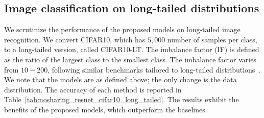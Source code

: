 \documentclass[runningheads]{llncs}
\providecommand{\citep}{\cite}
\begin{document}
         





















































\subsection{Image classification on long-tailed distributions}
\label{ssec:nosharing_experiments_long_tailed_distribution}

We scrutinize the performance of the proposed models on long-tailed image recognition. We convert CIFAR10, which has $5,000$ number of samples per class, to a long-tailed version, called CIFAR10-LT. The imbalance factor (IF) is defined as the ratio of the largest class to the smallest class. The imbalance factor varies from $10-200$, following similar benchmarks tailored to long-tailed distributions~\citep{cui2019class}. We note that the models are as defined above; the only change is the data distribution. The accuracy of each method is reported in Table~\ref{tab:nosharing_resnet_cifar10_long_tailed}. The results exhibit the benefits of the proposed models, which outperform the baselines.
\end{document}
